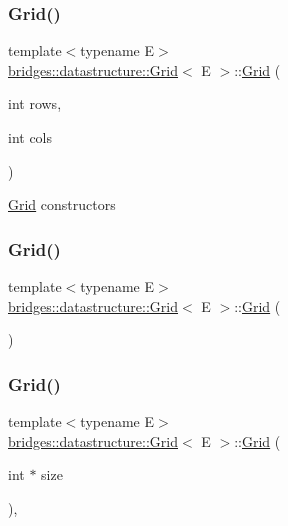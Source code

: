 \subsubsection{\texorpdfstring{Grid()}{Grid()}\hspace{0.1cm}{\footnotesize\ttfamily [1/4]}}
{\footnotesize\ttfamily template$<$typename E$>$ \\
\hyperlink{classbridges_1_1datastructure_1_1_grid}{bridges\+::datastructure\+::\+Grid}$<$ E $>$\+::\hyperlink{classbridges_1_1datastructure_1_1_grid}{Grid} (\begin{DoxyParamCaption}\item[{int}]{rows,  }\item[{int}]{cols }\end{DoxyParamCaption})\hspace{0.3cm}{\ttfamily [inline]}}

\hyperlink{classbridges_1_1datastructure_1_1_grid}{Grid} constructors \mbox{\label{classbridges_1_1datastructure_1_1_grid_a41c8c94cd9a22ccf978c5e2b1141c813}} 
\subsubsection{\texorpdfstring{Grid()}{Grid()}\hspace{0.1cm}{\footnotesize\ttfamily [2/4]}}
{\footnotesize\ttfamily template$<$typename E$>$ \\
\hyperlink{classbridges_1_1datastructure_1_1_grid}{bridges\+::datastructure\+::\+Grid}$<$ E $>$\+::\hyperlink{classbridges_1_1datastructure_1_1_grid}{Grid} (\begin{DoxyParamCaption}{ }\end{DoxyParamCaption})\hspace{0.3cm}{\ttfamily [inline]}}

\mbox{\label{classbridges_1_1datastructure_1_1_grid_ad47ddbed7bbd07f98aaa61b74fcf826c}} 
\subsubsection{\texorpdfstring{Grid()}{Grid()}\hspace{0.1cm}{\footnotesize\ttfamily [3/4]}}
{\footnotesize\ttfamily template$<$typename E$>$ \\
\hyperlink{classbridges_1_1datastructure_1_1_grid}{bridges\+::datastructure\+::\+Grid}$<$ E $>$\+::\hyperlink{classbridges_1_1datastructure_1_1_grid}{Grid} (\begin{DoxyParamCaption}\item[{int $\ast$}]{size }\end{DoxyParamCaption})\hspace{0.3cm}{\ttfamily [inline]}, {\ttfamily [explicit]}}

